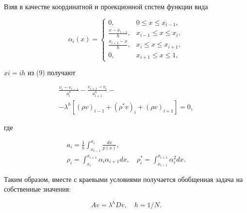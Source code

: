 \documentclass[10pt]{article}
\begin{document}
Взяв в качестве координатной и проекционной спстем функции вида



\[

\alpha_{i}(x)=\left\{\begin{array}{cl}

0, & 0 \leqslant x \leqslant x_{i-1}, \\

\frac{x-x_{i-1}}{h}, & x_{i-1} \leqslant x \leqslant x_{i}, \\

\frac{x_{i+1}-x}{h}, & x_{i} \leqslant x \leqslant x_{i+1}, \\

0, & x_{i+1} \leqslant x \leqslant 1,

\end{array}\right.

\]



$x i=i h$ из (9) получают



\[

\begin{gathered}

\frac{v_{i}-v_{i-1}}{a_{i}^{h}}-\frac{v_{i+1}-v_{i}}{a_{i+1}^{h}}- \\

-\lambda^{h}\left[(\rho v)_{i-1}+\left(\rho^{*} v\right)_{i}+(\rho v)_{i+1}\right]=0,

\end{gathered}

\]



где



\[

\begin{gathered}

a_{i}=\frac{1}{h} \int_{x_{i-1}}^{x_{i}} \frac{d x}{p(x)}, \\

\rho_{i}=\int_{x_{i}}^{x_{i+1}} \alpha_{i} \alpha_{i+1} d x, \quad \rho_{i}^{*}=\int_{x_{i-1}}^{x_{i+1}} \alpha_{i}^{2} d x .

\end{gathered}

\]



Таким образом, вместе с краевыми условиями получается обобщенная задача на собственные значения:



\[

A v=\lambda^{h} D v, \quad h=1 / N .

\]
\end{document}
